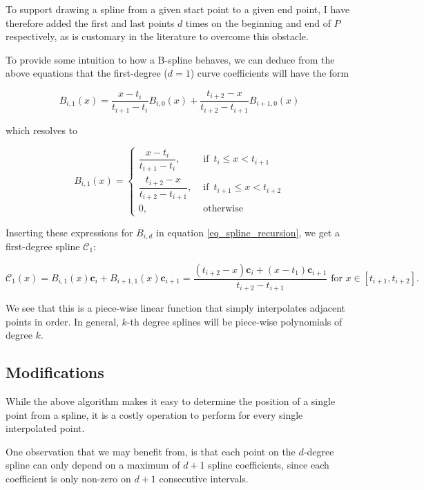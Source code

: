 \documentclass[english]{article}
\begin{document}
To support drawing a spline from a given start point to a given end point, I have therefore added the first and last points $d$ times on the beginning and end of $P$ respectively, as is customary in the literature to overcome this obstacle.

To provide some intuition to how a B-spline behaves, we can deduce from the above equations that the first-degree ($d = 1$) curve coefficients will have the form

\[
B_{i,1}(x) = \dfrac{x - t_i}{t_{i + 1} - t_i}B_{i,0}(x) + \dfrac{t_{i + 2} - x}{t_{i + 2} - t_{i + 1}}B_{i + 1,0}(x)
\]

which resolves to

\[
B_{i,1}(x) =
\begin{cases}
  \dfrac{x - t_i}{t_{i + 1} - t_i},            &\text{ if } \, t_i \leq x < t_{i + 1} \\
  \dfrac{t_{i + 2} - x}{t_{i + 2} - t_{i + 1}}, &\text{ if } \, t_{i + 1} \leq x < t_{i + 2} \\
  0, &\text{ otherwise }
\end{cases}
\]

Inserting these expressions for $B_{i,d}$ in equation \ref{eq_spline_recursion}, we get a first-degree spline $\mathcal{C}_1$:

\[
\mathcal{C}_1(x) = B_{i,1}(x)\mathbf{c}_i + B_{i+1,1}(x)\mathbf{c}_{i + 1} = \dfrac{(t_{i + 2} - x)\mathbf{c}_i + (x - t_1)\mathbf{c}_{i + 1}}{t_{i + 2} - t_{i + 1}} \text{ for } x \in [t_{i + 1}, t_{i + 2}].
\]

We see that this is a piece-wise linear function that simply interpolates adjacent points in order. In general, $k$-th degree splines will be piece-wise polynomials of degree $k$.

\subsection{Modifications}

While the above algorithm makes it easy to determine the position of a single point from a spline, it is a costly operation to perform for every single interpolated point.

One observation that we may benefit from, is that each point on the $d$-degree spline can only depend on a maximum of $d + 1$ spline coefficients, since each coefficient is only non-zero on $d + 1$ consecutive intervals.
\end{document}
